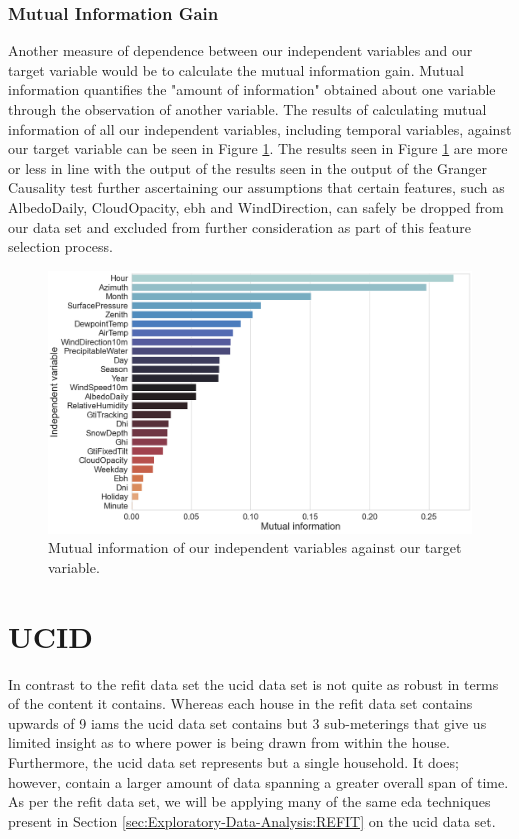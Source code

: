 \subsubsection{Mutual Information Gain}
\label{subsubsec:Exploratory-Data-Analysis:REFIT:Causality-and-Correlation:Mutual-Information-Gain}
Another measure of dependence between our independent variables and our target variable would be to calculate the mutual information gain. Mutual information quantifies the "amount of information" obtained about one variable through the observation of another variable. The results of calculating mutual information of all our independent variables, including temporal variables, against our target variable can be seen in Figure \ref{fig:REFIT-House-12-Mutual-Information-Gain}. The results seen in Figure \ref{fig:REFIT-House-12-Mutual-Information-Gain} are more or less in line with the output of the results seen in the output of the Granger Causality test further ascertaining our assumptions that certain features, such as AlbedoDaily, CloudOpacity, \gls{ebh} and WindDirection, can safely be dropped from our data set and excluded from further consideration as part of this feature selection process.

\begin{figure}[H]
    \centering
    \includegraphics[width=\textwidth]{Images/Chapter 5/REFIT/REFIT-House-12-Mutual-Information-2.png}
    \caption{Mutual information of our independent variables against our target variable.}
    \label{fig:REFIT-House-12-Mutual-Information-Gain}
\end{figure}

\section{UCID}
\label{sec:Exploratory-Data-Analysis:UCID}
In contrast to the \gls{refit} data set the \gls{ucid} data set is not quite as robust in terms of the content it contains. Whereas each house in the \gls{refit} data set contains upwards of 9 \glspl{iam} the \gls{ucid} data set contains but 3 sub-meterings that give us limited insight as to where power is being drawn from within the house. Furthermore, the \gls{ucid} data set represents but a single household. It does; however, contain a larger amount of data spanning a greater overall span of time. As per the \gls{refit} data set, we will be applying many of the same \gls{eda} techniques present in Section \ref{sec:Exploratory-Data-Analysis:REFIT} on the \gls{ucid} data set.

